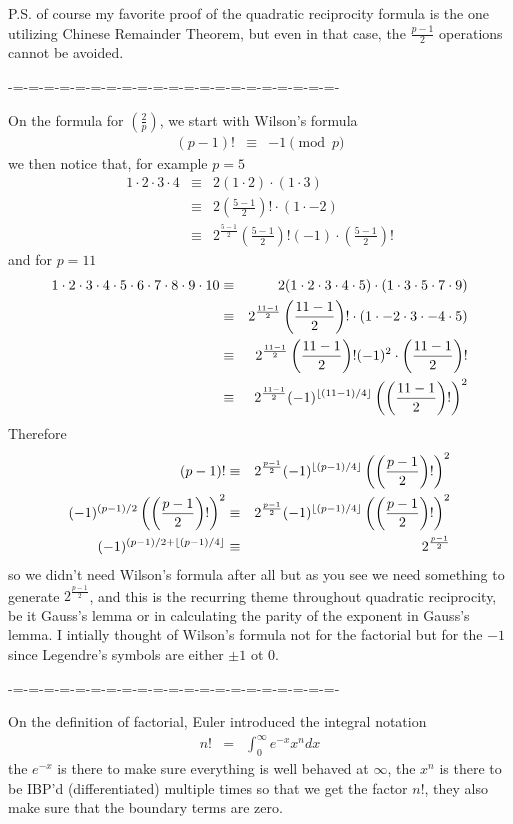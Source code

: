 \documentclass[aps,preprint,preprintnumbers,nofootinbib,showpacs,prd]{revtex4-1}
\newcommand{\nbea}{\begin{eqnarray*}}
\newcommand{\neea}{\end{eqnarray*}}
\DeclarePairedDelimiter{\floor}{\lfloor}{\rfloor}
\begin{document}
P.S. of course my favorite proof of the quadratic reciprocity formula is the one utilizing Chinese Remainder Theorem, but even in that case, the $\frac{p-1}{2}$ operations cannot be avoided.

-=-=-=-=-=-=-=-=-=-=-=-=-=-=-=-=-=-=-=-=-=-

On the formula for $\left(\frac{2}{p}\right)$, we start with Wilson's formula
%
\nbea
(p-1)! & \equiv & -1 \pmod{p}
\neea
%
we then notice that, for example $p=5$
%
\nbea
1\cdot2\cdot3\cdot4 & \equiv & 2 (1\cdot 2) \cdot (1 \cdot 3) \\
& \equiv & 2 \left ( \frac{5-1}{2}\right)! \cdot (1\cdot-2) \\
& \equiv & 2^{\frac{5-1}{2}} \left ( \frac{5-1}{2}\right)! (-1)\cdot \left ( \frac{5-1}{2}\right)!
\neea
%
and for $p=11$
%
\nbea
1\cdot2\cdot3\cdot4 \cdot 5\cdot 6\cdot 7\cdot 8\cdot 9\cdot 10 & \equiv & 2 (1\cdot 2\cdot 3\cdot4 \cdot 5) \cdot (1 \cdot 3 \cdot 5\cdot 7\cdot 9) \\
& \equiv & 2^{\frac{11-1}{2}} \left ( \frac{11-1}{2}\right)! \cdot (1\cdot-2\cdot 3 \cdot-4 \cdot 5) \\
& \equiv & 2^{\frac{11-1}{2}} \left ( \frac{11-1}{2}\right)! (-1)^2\cdot \left ( \frac{11-1}{2}\right)! \\
& \equiv & 2^{\frac{11-1}{2}} (-1)^{\floor{(11-1)/4}} \left (\left ( \frac{11-1}{2}\right)!\right)^2
\neea
%
Therefore
%
\nbea
(p-1)! & \equiv & 2^{\frac{p-1}{2}} (-1)^{\floor{(p-1)/4}} \left (\left ( \frac{p-1}{2}\right)!\right)^2 \\
(-1)^{(p-1)/2} \left (\left ( \frac{p-1}{2}\right)!\right)^2 & \equiv & 2^{\frac{p-1}{2}} (-1)^{\floor{(p-1)/4}} \left (\left ( \frac{p-1}{2}\right)!\right)^2 \\
(-1)^{(p-1)/2 + \floor{(p-1)/4}} & \equiv & 2^{\frac{p-1}{2}}
\neea
%
so we didn't need Wilson's formula after all but as you see we need something to generate $2^{\frac{p-1}{2}}$, and this is the recurring theme throughout quadratic reciprocity, be it Gauss's lemma or in calculating the parity of the exponent in Gauss's lemma. I intially thought of Wilson's formula not for the factorial but for the $-1$ since Legendre's symbols are either $\pm1$ ot 0.

-=-=-=-=-=-=-=-=-=-=-=-=-=-=-=-=-=-=-=-=-=-

On the definition of factorial, Euler introduced the integral notation
%
\nbea
n! & = & \int_0^\infty e^{-x} x^n dx
\neea
%
the $e^{-x}$ is there to make sure everything is well behaved at $\infty$, the $x^n$ is there to be IBP'd (differentiated) multiple times so that we get the factor $n!$, they also make sure that the boundary terms are zero.
\end{document}
